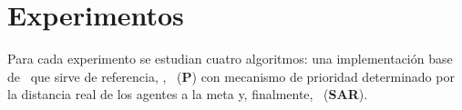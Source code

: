 \section{Experimentos}
\label{sec:experiments}

Para cada experimento se estudian cuatro algoritmos:
una implementaci\'on base de \astar\ que sirve de referencia,
\ambush, \pambush\ (\textbf{P}) con mecanismo de prioridad determinado por
la distancia real de los agentes a la meta y, finalmente, \sarambush\
(\textbf{SAR}).


